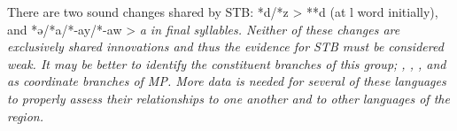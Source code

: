 There are two sound changes shared by STB: *d/*z > **d (at l
word initially), and *ə/*a/*-ay/*-aw > \it{a} in final syllables.
Neither of these changes are exclusively shared innovations
and thus the evidence for STB must be considered weak.
It may be better to identify the constituent branches of this
group; , , , and 
as coordinate branches of MP.
More data is needed for several of these languages to properly
assess their relationships to one another
and to other languages of the region.